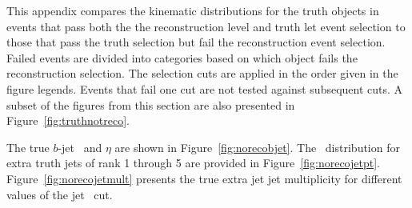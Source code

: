 
This appendix compares the kinematic distributions for the truth objects in events that pass both the
the reconstruction level and truth let event selection to those that pass the truth selection 
but fail the reconstruction event selection.   Failed events are divided into categories based on which object fails
the reconstruction selection.  The selection cuts are applied in the order given in the figure legends.  Events that
fail one cut are not tested against subsequent cuts.  A subset of the figures from this section are also presented
in Figure~\ref{fig:truthnotreco}.

The true $b$-jet \pt\ and $\eta$  are shown in Figure~\ref{fig:norecobjet}.
The \pt\ distribution for extra truth jets of rank 1 through 5 are provided in Figure~\ref{fig:norecojetpt}. 
Figure~\ref{fig:norecojetmult} presents the true extra jet
jet multiplicity for different values of the jet \pt\ cut.

